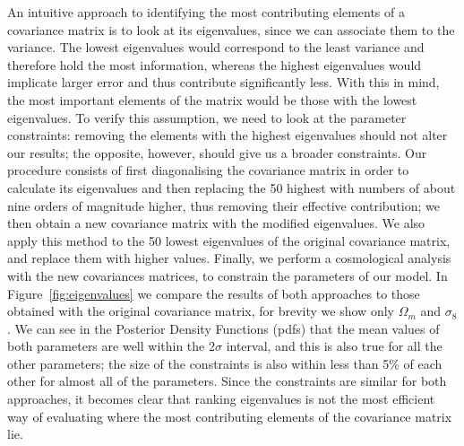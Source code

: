 \documentclass[twocolumn]{\docclass}
\newcommand{\rf}[1]{\ref{fig:#1}}
\begin{document}
An intuitive  approach to identifying the most contributing elements of a covariance matrix is to look at its eigenvalues, since we can associate them to the variance. The lowest eigenvalues would correspond to the least variance and therefore hold the most information, whereas the highest eigenvalues would implicate larger error and thus contribute significantly less. With this in mind, the most important elements of the matrix would be those with the lowest eigenvalues. To verify this assumption, we need to look at the parameter constraints: removing the elements with the highest eigenvalues should not alter our results; the opposite, however, should give us a broader constraints. Our procedure consists of first diagonalising the covariance matrix in order to calculate its eigenvalues and then replacing the 50 highest with numbers of about nine orders of magnitude higher, thus removing their effective contribution; we then obtain a new covariance matrix with the modified eigenvalues. We also apply this method to the 50 lowest eigenvalues of the original covariance matrix, and replace them with higher values. Finally, we perform a cosmological analysis with the new covariances matrices, to constrain the parameters of our model. In Figure~\rf{eigenvalues} we compare the results of both approaches to those obtained with the original covariance matrix, for brevity we show only $\Omega_m$ and $\sigma_8$. We can see in the Posterior Density Functions (pdfs) that the mean values of both parameters are well within the $2\sigma$ interval, and this is also true for all the other parameters; the size of the constraints is also within less than 5\% of each other for almost all of the parameters. Since the constraints are similar for both approaches, it becomes clear that ranking eigenvalues is not the most efficient way of evaluating where the most contributing elements of the covariance matrix lie.
\end{document}
